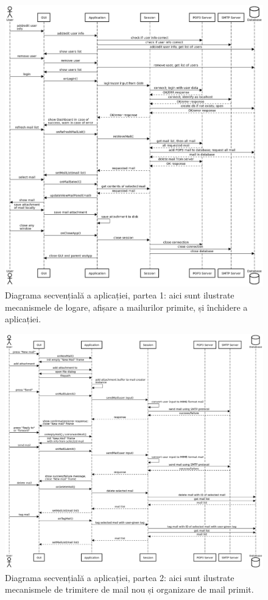 \documentclass[runningheads]{llncs}
\begin{document}
\begin{figure}
\includegraphics[width=\textwidth]{POSHET1.png}
\caption{Diagrama secvențială a aplicației, partea 1: aici sunt ilustrate mecanismele de logare, afișare a mailurilor primite, și închidere a aplicației.} \label{firsthalf}
\end{figure}

\begin{figure}
\includegraphics[width=\textwidth]{POSHET2.png}
\caption{Diagrama secvențială a aplicației, partea 2: aici sunt ilustrate mecanismele de trimitere de mail nou și organizare de mail primit.} \label{secondhalf}
\end{figure}
\end{document}

